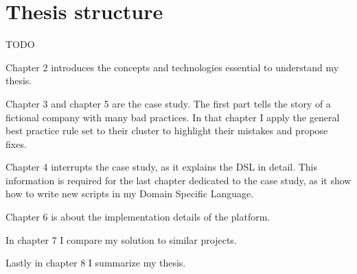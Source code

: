 \section{Thesis structure}

TODO

Chapter 2 introduces the concepts and technologies essential to understand my thesis.

Chapter 3 and chapter 5 are the case study. The first part tells the story of a fictional company with many bad practices. In that chapter I apply the general best practice rule set to their cluster to highlight their mistakes and propose fixes.

Chapter 4 interrupts the case study, as it explains the DSL in detail. This information is required for the last chapter dedicated to the case study, as it show how to write new scripts in my Domain Specific Language.

Chapter 6 is about the implementation details of the platform.

In chapter 7 I compare my solution to similar projects.

Lastly in chapter 8 I summarize my thesis.